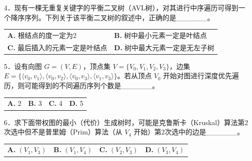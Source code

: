 \documentclass[UTF8,11pt]{ctexart}
\begin{document}
4．现有一棵无重复关键字的平衡二叉树（AVL树），对其进行中序遍历可得到一个降序序列。下列关于该平衡二叉树的叙述中，正确的是\_\_\_\_\_\_。


\begin{center}\begin{tabular}{>{\raggedright\arraybackslash}p{\dimexpr(\linewidth-4\tabcolsep)/2\relax}>{\raggedright\arraybackslash}p{\dimexpr(\linewidth-4\tabcolsep)/2\relax}}
\textbf{A.} 根结点的度一定为2 & \textbf{B.} 树中最小元素一定是叶结点\\[.35em]
\textbf{C.} 最后插入的元素一定是叶结点 & \textbf{D.} 树中最大元素一定是无左子树\\[.35em]\end{tabular}\end{center}

5．设有向图 \(\displaystyle G=(V,\allowbreak E)\)，顶点集 \(\displaystyle V=\{V_0,\allowbreak V_1,\allowbreak V_2,\allowbreak V_3\}\)，边集 \(\displaystyle E=\{\langle v_0,\allowbreak v_1\rangle,\allowbreak \langle v_0,\allowbreak v_2\rangle,\allowbreak \langle v_0,\allowbreak v_3\rangle,\allowbreak \langle v_1,\allowbreak v_3\rangle\}\)。若从顶点 \(\displaystyle V_0\) 开始对图进行深度优先遍历，则可能得到的不同遍历序列个数是\_\_\_\_\_\_。


\begin{center}\begin{tabular}{>{\raggedright\arraybackslash}p{\dimexpr(\linewidth-8\tabcolsep)/4\relax}>{\raggedright\arraybackslash}p{\dimexpr(\linewidth-8\tabcolsep)/4\relax}>{\raggedright\arraybackslash}p{\dimexpr(\linewidth-8\tabcolsep)/4\relax}>{\raggedright\arraybackslash}p{\dimexpr(\linewidth-8\tabcolsep)/4\relax}}
\textbf{A.} 2 & \textbf{B.} 3 & \textbf{C.} 4 & \textbf{D.} 5\\[.35em]\end{tabular}\end{center}

6．求下面带权图的最小（代价）生成树时，可能是克鲁斯卡（Kruskal）算法第2次选中但不是普里姆（Prim）算法（从 \(\displaystyle V_4\) 开始）第2次选中的边是\_\_\_\_\_\_。


\begin{center}\begin{tabular}{>{\raggedright\arraybackslash}p{\dimexpr(\linewidth-8\tabcolsep)/4\relax}>{\raggedright\arraybackslash}p{\dimexpr(\linewidth-8\tabcolsep)/4\relax}>{\raggedright\arraybackslash}p{\dimexpr(\linewidth-8\tabcolsep)/4\relax}>{\raggedright\arraybackslash}p{\dimexpr(\linewidth-8\tabcolsep)/4\relax}}
\textbf{A.} \(\displaystyle (V_1,\allowbreak V_3)\) & \textbf{B.} \(\displaystyle (V_1,\allowbreak V_4)\) & \textbf{C.} \(\displaystyle (V_2,\allowbreak V_3)\) & \textbf{D.} \(\displaystyle (V_3,\allowbreak V_4)\)\\[.35em]\end{tabular}\end{center}
\end{document}
